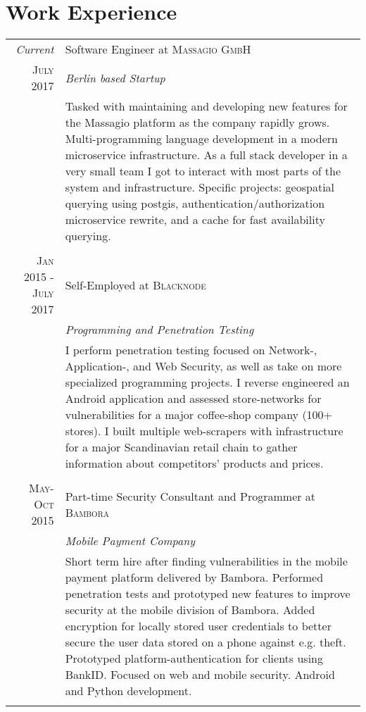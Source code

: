 \documentclass[a4paper,10pt]{article}
\begin{document}
\section{Work Experience}
\begin{tabular}{r|p{11cm}}
 \emph{Current} & Software Engineer at \textsc{Massagio GmbH} \\
 \textsc{July 2017}&\emph{Berlin based Startup}\\
 &\footnotesize{Tasked with maintaining and developing new features for the Massagio platform as the company rapidly grows. Multi-programming language development in a modern microservice infrastructure. As a full stack developer in a very small team I got to interact with most parts of the system and infrastructure. Specific projects: geospatial querying using postgis, authentication/authorization microservice rewrite, and a cache for fast availability querying.}\\ \multicolumn{2}{c}{} \\

 \textsc{Jan 2015 - July 2017} & Self-Employed at \textsc{Blacknode} \\
 &\emph{Programming and Penetration Testing}\\
 &\footnotesize{I perform penetration testing focused on Network-, Application-, and Web Security, as well as take on more specialized programming projects. I reverse engineered an Android application and assessed store-networks for vulnerabilities for a major coffee-shop company (100+ stores). I built multiple web-scrapers with infrastructure for a major Scandinavian retail chain to gather information about competitors' products and prices.}\\\multicolumn{2}{c}{} \\
 
 \textsc{May-Oct 2015} & Part-time Security Consultant and Programmer at \textsc{Bambora}\\
 &\emph{Mobile Payment Company}\\&\footnotesize{Short term hire after finding vulnerabilities in the mobile payment platform delivered by Bambora. Performed penetration tests and prototyped new features to improve security at the mobile division of Bambora. Added encryption for locally stored user credentials to better secure the user data stored on a phone against e.g. theft. Prototyped platform-authentication for clients using BankID. Focused on web and mobile security. Android and Python development.}\\\multicolumn{2}{c}{} \\
 

\end{tabular}
\end{document}
